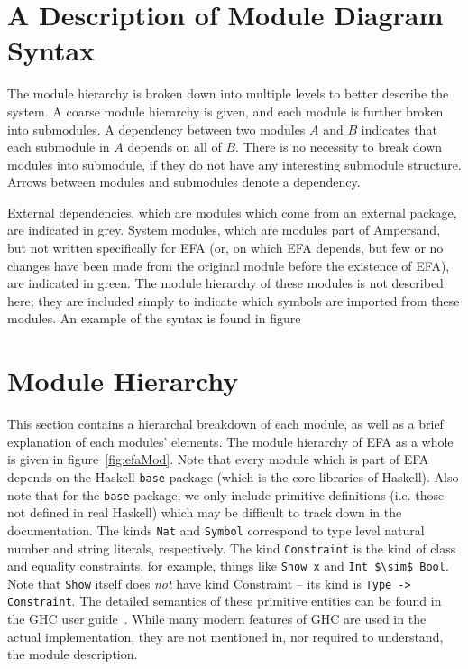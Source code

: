 \section{A Description of Module Diagram Syntax}\label{subsec:ModuleSyntax}

The module hierarchy is broken down into multiple levels to better describe the
system.  A coarse module hierarchy is given, and each module is further broken
into submodules.  A dependency between two modules $A$ and $B$ indicates that
each submodule in $A$ depends on all of $B$. There is no necessity to break
down modules into submodule, if they do not have any interesting submodule 
structure. Arrows between modules and submodules denote a dependency. 

External dependencies, which are modules which come from an external package,
are indicated in {\color{grey}grey}. System modules, which are modules part of
Ampersand, but not written specifically for EFA (or, on which EFA depends, but
few or no changes have been made from the original module before the existence
of EFA), are indicated in {\color{applegreen}green}. The module hierarchy of
these modules is not described here; they are included simply to indicate which
symbols are imported from these modules. An example of the syntax is found in
figure%

\section{Module Hierarchy}\label{subsec:modhierarchy}

This section contains a hierarchal breakdown of each module, as well as a brief
explanation of each modules' elements. The module hierarchy of EFA as a whole 
is 
given in figure~\ref{fig:efaMod}.  Note
that every module which is part of EFA depends on the Haskell \texttt{base} 
package
(which is the core libraries of Haskell). Also note that for the \texttt{base}
package, we only include primitive definitions (i.e. those not defined in real
Haskell) which may be difficult to track down in the documentation. The kinds
\lstinline{Nat} and \lstinline{Symbol} correspond to type level natural number 
and string
literals, respectively. The kind \lstinline{Constraint} is the kind of class and
equality constraints, for example, things like \lstinline{Show x} and 
\lstinline[mathescape]|Int $\sim$ Bool|.  
Note that \texttt{Show} itself does \emph{not} have kind Constraint --
its kind is \lstinline{Type -> Constraint}. The detailed semantics of these
primitive entities can be found in the GHC user guide~\cite{ghcUserGuide}. While
many modern features of GHC are used in the actual implementation, they are not
mentioned in, nor required to understand, the module description.

